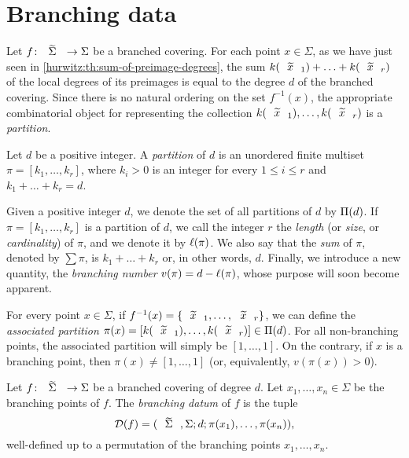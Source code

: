 \section{Branching data}

Let $\map{f}{\tSigma}{\Sigma}$ be a branched covering. For each point $x\in\Sigma$, as we have just seen in \cref{hurwitz:th:sum-of-preimage-degrees}, the sum $k(\wtilde{x}_1)+\ldots+k(\wtilde{x}_r)$ of the local degrees of its preimages is equal to the degree $d$ of the branched covering. Since there is no natural ordering on the set $f^{-1}(x)$, the appropriate combinatorial object for representing the collection $k(\wtilde{x}_1),\ldots,k(\wtilde{x}_r)$ is a \emph{partition}.

\begin{definition}
Let $d$ be a positive integer. A \emph{partition} of $d$ is an unordered finite multiset $\pi=[k_1,\ldots,k_r]$, where $k_i>0$ is an integer for every $1\le i\le r$ and $k_1+\ldots+k_r=d$.
\end{definition}

Given a positive integer $d$, we denote the set of all partitions of $d$ by $\Pi(d)$. If $\pi=[k_1,\ldots,k_r]$ is a partition of $d$, we call the integer $r$ the \emph{length} (or \emph{size}, or \emph{cardinality}) of $\pi$, and we denote it by $\ell(\pi)$. We also say that the \emph{sum} of $\pi$, denoted by $\sum\pi$, is $k_1+\ldots+k_r$ or, in other words, $d$. Finally, we introduce a new quantity, the \emph{branching number} $v(\pi)=d-\ell(\pi)$, whose purpose will soon become apparent.

For every point $x\in\Sigma$, if $f^{-1}(x)=\{\wtilde{x}_1,\ldots,\wtilde{x}_r\}$, we can define the \emph{associated partition} $\pi(x)=[k(\wtilde{x}_1),\ldots,k(\wtilde{x}_r)]\in\Partitions{d}$. For all non-branching points, the associated partition will simply be $[1,\ldots,1]$. On the contrary, if $x$ is a branching point, then $\pi(x)\neq[1,\ldots,1]$ (or, equivalently, $v(\pi(x))>0$).

\begin{definition}
Let $\map{f}{\tSigma}{\Sigma}$ be a branched covering of degree $d$. Let $x_1,\ldots,x_n\in\Sigma$ be the branching points of $f$. The \emph{branching datum} of $f$ is the tuple
\[
\DD(f)=\datum{\tSigma,\Sigma}{d}{\pi(x_1),\ldots,\pi(x_n)},
\]
well-defined up to a permutation of the branching points $x_1,\ldots,x_n$.
\end{definition}

